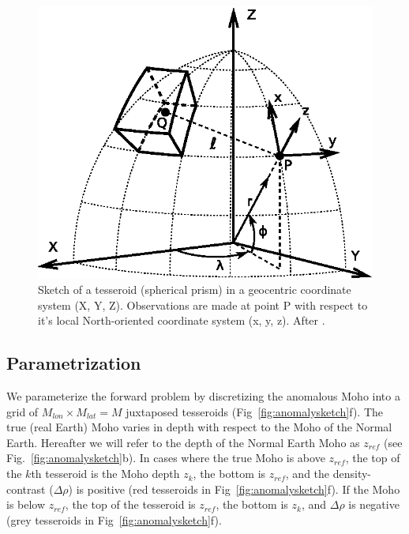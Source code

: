 \documentclass[extra]{gji}
\begin{document}
\begin{figure}
    \centering
    \includegraphics{figures/tesseroid-coord-sys}
    \caption{Sketch of a tesseroid (spherical prism) in a geocentric coordinate
        system (X, Y, Z).
        Observations are made at point P with respect to it's local
        North-oriented coordinate system (x, y, z).
        After \citet{uieda2015}.
    }
    \label{fig:tesseroid}
\end{figure}



\subsection{Parametrization}

We parameterize the forward problem by discretizing the anomalous Moho
into a grid of $M_{lon} \times M_{lat} = M$ juxtaposed tesseroids
(Fig~\ref{fig:anomalysketch}f).
The true (real Earth) Moho varies in depth
with respect to the Moho of the Normal Earth.
Hereafter we will refer to the depth of the Normal Earth Moho as $z_{ref}$
(see Fig.~\ref{fig:anomalysketch}b).
In cases where the true Moho is above $z_{ref}$,
the top of the $k$th tesseroid is the Moho depth $z_{k}$,
the bottom is $z_{ref}$, and the density-contrast ($\Delta\rho$) is positive
(red tesseroids in Fig~\ref{fig:anomalysketch}f).
If the Moho is below $z_{ref}$, the top of the tesseroid is $z_{ref}$,
the bottom is $z_k$, and $\Delta\rho$ is negative
(grey tesseroids in Fig~\ref{fig:anomalysketch}f).
\end{document}

